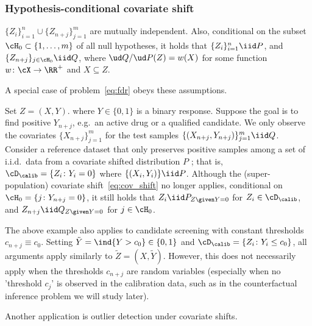 \subsubsection{Hypothesis-conditional covariate shift}
\label{subsec:outlier}


\begin{assumption}
  \label{assump:label_conditional}
$\{Z_i\}_{i=1}^n\cup\{Z_{n+j}\}_{j=1}^m$ are mutually independent.
Also, conditional on the subset $\cH_0\subset\{1,\dots,m\}$
of all null hypotheses, it holds that $\{Z_i\}_{i=1}^n\iid P$,
and $\{Z_{n+j}\}_{j\in \cH_0} \iid Q$, where $ \ud Q/\ud P (Z)=w(X)$
for some function $w\colon \cX\to \RR^+$ and $X\subseteq Z$.
\end{assumption}


A special case of
problem~\eqref{eq:fdr}
obeys these assumptions.

\begin{example}\normalfont
\label{ex:binary}
Set $Z=(X,Y)$. where $Y\in\{0,1\}$ is a binary response.
Suppose the goal is to find positive $Y_{n+j}$,
e.g.~an active drug or a qualified candidate. We only observe the covariates $\{X_{n+j}\}_{j=1}^m$ for the test samples
$\{(X_{n+j},Y_{n+j})\}_{j=1}^m\iid Q$.
Consider a reference dataset
that only preserves positive samples among a set of i.i.d.~data
from a covariate shifted distribution $P$ ; that is,
$\cD_\calib = \{Z_i\colon Y_{i}=0\}$ where $\{(X_i,Y_i)\}\iid P$.
Although the (super-population) covariate shift~\eqref{eq:cov_shift} no longer applies,
conditional on $\cH_0 = \{j\colon Y_{n+j}=0\}$,
it still holds that $Z_i\iid P_{Z\given Y=0}$ for $Z_i\in \cD_\calib$, and
$Z_{n+j}\iid Q_{Z\given Y=0}$ for $j\in \cH_0$.
\end{example}

The above example also applies to
candidate screening
with constant thresholds
$c_{n+j} \equiv c_0$.
Setting $\tilde{Y} = \ind\{Y > c_0\}\in\{0,1\}$
and $\cD_{\calib} = \{Z_i\colon Y_i\leq c_0\}$, all
arguments apply similarly to $\tilde{Z}=(X,\tilde{Y})$.
%
However, this does not necessarily apply when the  thresholds $c_{n+j}$ are random variables (especially when no 'threshold $c_j$' is observed in the calibration data, such as in the
counterfactual inference problem we will study later).

Another application is outlier detection under covariate shifts.

